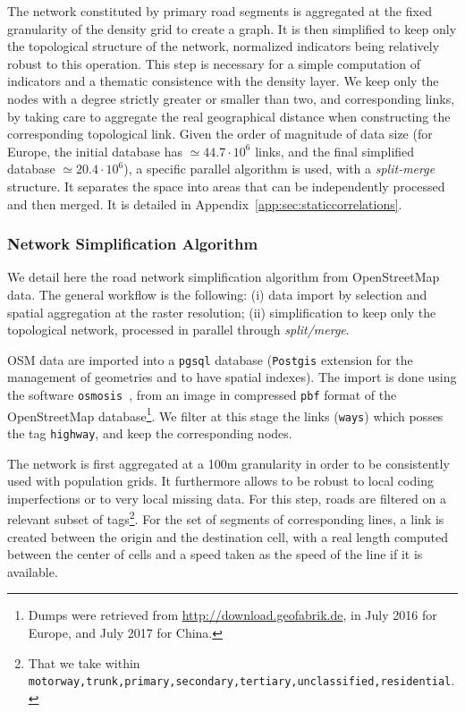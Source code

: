 The network constituted by primary road segments is aggregated at the fixed granularity of the density grid to create a graph. It is then simplified to keep only the topological structure of the network, normalized indicators being relatively robust to this operation. This step is necessary for a simple computation of indicators and a thematic consistence with the density layer. We keep only the nodes with a degree strictly greater or smaller than two, and corresponding links, by taking care to aggregate the real geographical distance when constructing the corresponding topological link. Given the order of magnitude of data size (for Europe, the initial database has $\simeq 44.7\cdot 10^6$ links, and the final simplified database $\simeq 20.4\cdot 10^6$), a specific parallel algorithm is used, with a \emph{split-merge} structure. It separates the space into areas that can be independently processed and then merged. It is detailed in Appendix~\ref{app:sec:staticcorrelations}.


\subsubsection{Network Simplification Algorithm}


We detail here the road network simplification algorithm from OpenStreetMap data. The general workflow is the following: (i) data import by selection and spatial aggregation at the raster resolution; (ii) simplification to keep only the topological network, processed in parallel through \emph{split/merge}.

OSM data are imported into a \texttt{pgsql} database (\texttt{Postgis} extension for the management of geometries and to have spatial indexes). The import is done using the software \texttt{osmosis}~\cite{osmosis}, from an image in compressed \texttt{pbf} format of the OpenStreetMap database\footnote{Dumps were retrieved from \url{http://download.geofabrik.de}, in July 2016 for Europe, and July 2017 for China.}. We filter at this stage the links (\texttt{ways}) which posses the tag \texttt{highway}, and keep the corresponding nodes.


The network is first aggregated at a 100m granularity in order to be consistently used with population grids. It furthermore allows to be robust to local coding imperfections or to very local missing data. For this step, roads are filtered on a relevant subset of tags\footnote{That we take within \texttt{motorway,trunk,primary,secondary,tertiary,unclassified,residential}.}. For the set of segments of corresponding lines, a link is created between the origin and the destination cell, with a real length computed between the center of cells and a speed taken as the speed of the line if it is available.

